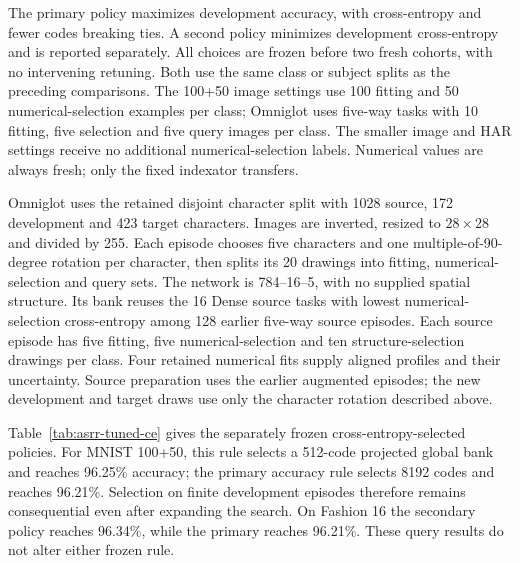 The primary policy maximizes development accuracy, with cross-entropy
and fewer codes breaking ties. A second policy minimizes development
cross-entropy and is reported separately. All choices are frozen before
two fresh cohorts, with no intervening retuning. Both use the same
class or subject splits as the preceding comparisons. The 100+50 image
settings use 100 fitting and 50 numerical-selection examples per class;
Omniglot uses five-way tasks with 10 fitting, five selection and five
query images per class. The smaller image and HAR settings receive no
additional numerical-selection labels. Numerical values are always
fresh; only the fixed indexator transfers.

Omniglot uses the retained disjoint character split with 1028 source,
172 development and 423 target characters. Images are inverted,
resized to $28\times28$ and divided by 255. Each episode chooses five
characters and one multiple-of-90-degree rotation per character, then
splits its 20 drawings into fitting, numerical-selection and query sets.
The network is 784--16--5, with no supplied spatial structure.
Its bank reuses the 16 Dense source tasks with lowest numerical-selection
cross-entropy among 128 earlier five-way source episodes. Each source
episode has five fitting, five numerical-selection and ten
structure-selection drawings per class. Four retained numerical fits
supply aligned profiles and their uncertainty. Source preparation uses
the earlier augmented episodes; the new development and target draws
use only the character rotation described above.


\FloatBarrier

Table~\ref{tab:asrr-tuned-ce} gives the separately frozen
cross-entropy-selected policies. For MNIST 100+50, this rule selects a
512-code projected global bank and reaches 96.25\% accuracy; the primary
accuracy rule selects 8192 codes and reaches 96.21\%. Selection on finite
development episodes therefore remains consequential even after expanding
the search. On Fashion 16 the secondary policy reaches 96.34\%, while
the primary reaches 96.21\%. These query results do not alter either
frozen rule.

\FloatBarrier
